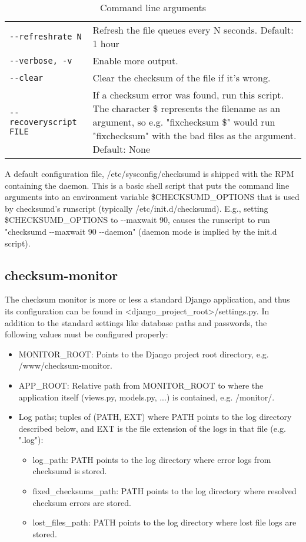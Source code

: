 \begin{table}[ht]
\begin{tabular}{lp{10cm}}
{\tt -{}-refreshrate N}       & Refresh the file queues every N seconds. Default: 1 hour\\
{\tt -{}-verbose, -v}         & Enable more output.\\
{\tt -{}-clear}               & Clear the checksum of the file if it's wrong.\\
{\tt -{}-recoveryscript FILE} & If a checksum error was found, run this script. The character \$ represents the filename as an argument, so e.g. "fixchecksum \$" would run "fixchecksum" with the bad files as the argument. Default: None\\

\hline
\end{tabular}
\caption{Command line arguments}
\label{tab:cmdlineargs}
\end{table}

A default configuration file, /etc/sysconfig/checksumd is shipped with the RPM containing the daemon. This is a basic shell script that puts the command line arguments into an environment variable \$CHECKSUMD\_OPTIONS that is used by checksumd's runscript (typically /etc/init.d/checksumd). E.g., setting \$CHECKSUMD\_OPTIONS to -{}-maxwait 90, causes the runscript to run "checksumd -{}-maxwait 90 -{}-daemon" (daemon mode is implied by the init.d script).

\subsection{checksum-monitor}
The checksum monitor is more or less a standard Django application, and thus its configuration can be found in <django\_project\_root>/settings.py. In addition to the standard settings like database paths and passwords, the following values must be configured properly:
\begin{itemize}
\item MONITOR\_ROOT: Points to the Django project root directory, e.g. /www/checksum-monitor.
\item APP\_ROOT: Relative path from MONITOR\_ROOT to where the application itself (views.py, models.py, ...) is contained, e.g. /monitor/.
\item Log paths; tuples of (PATH, EXT) where PATH points to the log directory described below, and EXT is the file extension of the logs in that file (e.g. ".log"):
\begin{itemize}
\item log\_path: PATH points to the log directory where error logs from checksumd is stored.
\item fixed\_checksums\_path: PATH points to the log directory where resolved checksum errors are stored.
\item lost\_files\_path: PATH points to the log directory where lost file logs are stored.
\end{itemize}
\end{itemize}

